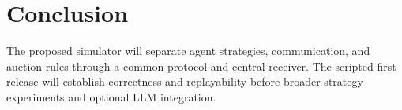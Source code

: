 \documentclass[11pt,a4paper]{article}
\begin{document}
\section{Conclusion}
The proposed simulator will separate agent strategies, communication, and auction rules through a common protocol and central receiver. The scripted first release will establish correctness and replayability before broader strategy experiments and optional LLM integration.



\end{document}

